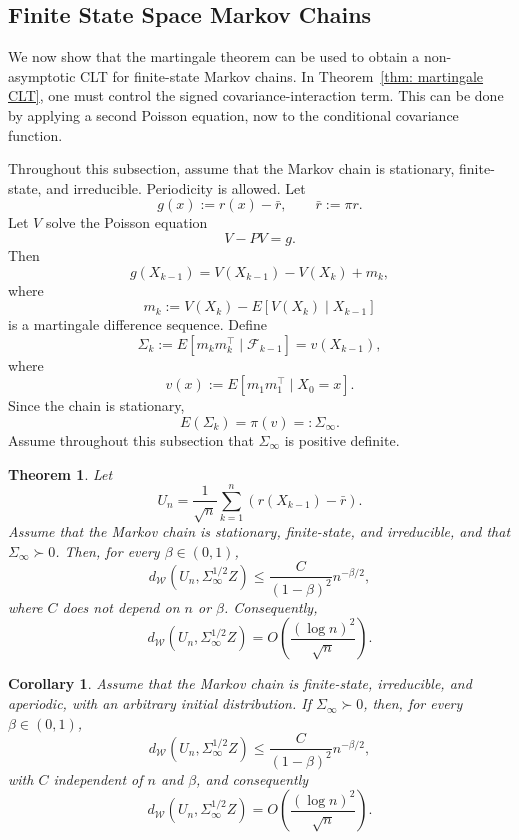 \documentclass[10pt,a4paper]{article}
\newtheorem{theorem}{Theorem}
\newtheorem{corollary}{Corollary}
\begin{document}
\subsection{Finite State Space Markov Chains}
\label{subsec: finite_state_MC_corrected}

We now show that the martingale theorem can be used to obtain a
non-asymptotic CLT for finite-state Markov chains.  In Theorem~\ref{thm: martingale CLT}, one must control
the signed covariance-interaction term.  This can
be done by applying a second Poisson equation, now to the conditional
covariance function.

Throughout this subsection, assume that the Markov chain is stationary,
finite-state, and irreducible.  Periodicity is allowed.  Let
\[
    g(x):=r(x)-\bar r,
    \qquad
    \bar r:=\pi r.
\]
Let \(V\) solve the Poisson equation
\[
    V-PV=g.
\]
Then
\[
    g(X_{k-1})
    =
    V(X_{k-1})-V(X_k)+m_k,
\]
where
\[
    m_k:=V(X_k)-E[V(X_k)\mid X_{k-1}]
\]
is a martingale difference sequence.  Define
\[
    \Sigma_k:=E[m_km_k^\top\mid \mathcal F_{k-1}]
    =
    v(X_{k-1}),
\]
where
\[
    v(x):=E[m_1m_1^\top\mid X_0=x].
\]
Since the chain is stationary,
\[
    E(\Sigma_k)=\pi(v)=:\Sigma_\infty.
\]
Assume throughout this subsection that \(\Sigma_\infty\) is positive definite.

\begin{theorem}\label{thm: MC CLT}
Let
\[
U_n=\frac1{\sqrt n}\sum_{k=1}^n(r(X_{k-1})-\bar r).
\]
Assume that the Markov chain is stationary, finite-state, and irreducible,
and that $\Sigma_\infty\succ0$. Then, for every $\beta\in(0,1)$,
\[
d_{\mathcal W}(U_n,\Sigma_\infty^{1/2}Z)
\le \frac{C}{(1-\beta)^2}n^{-\beta/2},
\]
where $C$ does not depend on $n$ or $\beta$. Consequently,
\[
d_{\mathcal W}(U_n,\Sigma_\infty^{1/2}Z)
=O\left(\frac{(\log n)^2}{\sqrt n}\right).
\]
\end{theorem}

\begin{corollary}\label{cor: MC CLT nonstationary}
Assume that the Markov chain is finite-state, irreducible, and aperiodic, with
an arbitrary initial distribution. If $\Sigma_\infty\succ0$, then, for every
$\beta\in(0,1)$,
\[
d_{\mathcal W}(U_n,\Sigma_\infty^{1/2}Z)
\le \frac{C}{(1-\beta)^2}n^{-\beta/2},
\]
with $C$ independent of $n$ and $\beta$, and consequently
\[
d_{\mathcal W}(U_n,\Sigma_\infty^{1/2}Z)
=O\left(\frac{(\log n)^2}{\sqrt n}\right).
\]
\end{corollary}
\end{document}

